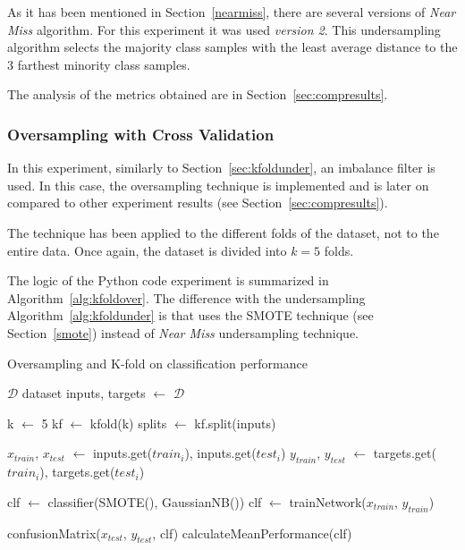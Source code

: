 As it has been mentioned in Section~\ref{nearmiss}, there are several versions 
of \textit{Near Miss} algorithm. For this experiment it was used \textit{version 
2}. This undersampling algorithm selects the majority class samples with the 
least average distance to the 3 farthest minority class samples.

The analysis of the metrics obtained are in Section~\ref{sec:compresults}.

\subsubsection{Oversampling with Cross Validation}

In this experiment, similarly to Section~\ref{sec:kfoldunder}, an imbalance 
filter is used. In this case, the oversampling technique is implemented and is 
later on compared to other experiment results (see 
Section~\ref{sec:compresults}).

The technique has been applied to the different folds of the dataset, not to the
entire data. Once again, the dataset is divided into $k=5$ folds. 

The logic of the Python code experiment is summarized in 
Algorithm~\ref{alg:kfoldover}. The difference with the undersampling 
Algorithm~\ref{alg:kfoldunder} is that uses the SMOTE technique (see 
Section~\ref{smote}) instead of \textit{Near Miss} undersampling technique.

\begin{breakablealgorithm}
    \caption{Oversampling and K-fold on classification performance}
    \footnotesize
    \label{alg:kfoldover}
    \begin{algorithmic}[1]
        \Require $\mathcal{D}$ dataset
        \State inputs, targets $\leftarrow$ $\mathcal{D}$
    
        \State k $\leftarrow$ 5
        \State kf $\leftarrow$ kfold(k)
        \State splits $\leftarrow$ kf.split(inputs)
        
        	\State $x_{train}$, $x_{test}$ $\leftarrow$ inputs.get($train_{i}$), inputs.get($test_{i}$)
        	\State $y_{train}$, $y_{test}$ $\leftarrow$ targets.get($train_{i}$), targets.get($test_{i}$)
        	
        	\State clf $\leftarrow$ classifier(SMOTE(), GaussianNB())
        	\State clf $\leftarrow$ trainNetwork($x_{train}$, $y_{train}$)
        	
        	\State confusionMatrix($x_{test}$, $y_{test}$, clf)
        \EndFor
        \State calculateMeanPerformance(clf)
    \end{algorithmic}
\end{breakablealgorithm}

